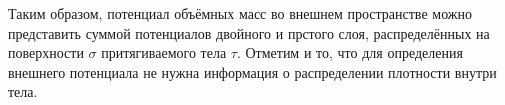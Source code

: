 \documentclass[11pt, a4paper]{article}
\theoremstyle{plain}
\theoremstyle{definition}
\theoremstyle{remark}
\begin{document}
Таким образом, потенциал объёмных масс во внешнем пространстве можно представить суммой
потенциалов двойного и прстого слоя, распределённых на поверхности $\sigma$ притягиваемого тела
$\tau$. Отметим и то, что для определения внешнего потенциала не нужна информация о распределении
плотности внутри тела.

\end{document}
